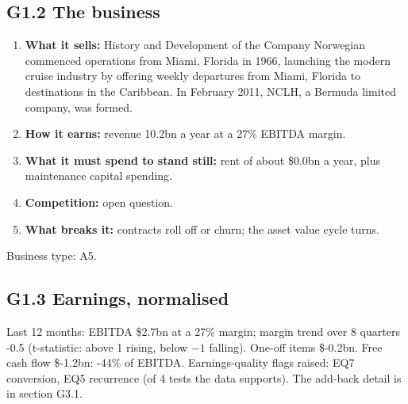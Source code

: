 \documentclass[11pt,a4paper]{article}
\begin{document}
\subsection*{G1.2 The business}
\begin{enumerate}
\item \textbf{What it sells:} History and Development of the Company Norwegian commenced operations from Miami, Florida in 1966, launching the modern cruise industry by offering weekly departures from Miami, Florida to destinations in the Caribbean. In February 2011, NCLH, a Bermuda limited company, was formed.
\item \textbf{How it earns:} revenue 10.2bn a year at a 27\% EBITDA margin.
\item \textbf{What it must spend to stand still:} rent of about \$0.0bn a year, plus maintenance capital spending.
\item \textbf{Competition:} open question.
\item \textbf{What breaks it:} contracts roll off or churn; the asset value cycle turns.
\end{enumerate}
Business type: A5.
\subsection*{G1.3 Earnings, normalised}
Last 12 months: EBITDA \$2.7bn at a 27\% margin; margin trend over 8 quarters -0.5 (t-statistic: above 1 rising, below $-1$ falling). One-off items \$-0.2bn. Free cash flow \$-1.2bn: -44\% of EBITDA. Earnings-quality flags raised: EQ7 conversion, EQ5 recurrence (of 4 tests the data supports). The add-back detail is in section G3.1.
\end{document}
